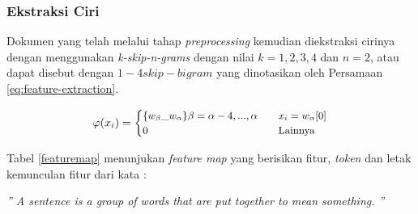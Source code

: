 \documentclass[../Proposal.tex]{subfiles}
\begin{document}
		\subsubsection{Ekstraksi Ciri }
		\noindent Dokumen yang telah melalui tahap \textit{preprocessing} kemudian diekstraksi cirinya dengan menggunakan \textit{k-skip-n-grams} dengan nilai $k= 1, 2, 3, 4$ dan $n=2$, atau dapat disebut dengan $1-4 skip-bigram$ yang dinotasikan oleh Persamaan \ref{eq:feature-extraction}.

		\begin{center}
			\begin{equation}
			\small
				\varphi(x_{i}) = 
					\begin{cases}
						\{w_{\beta}\_w_{\alpha}\} \beta = \alpha - 4 ,..., \alpha & \quad x_{i} = w_{\alpha}[0] \\
						0 & \quad \text{Lainnya} \\
					\end{cases}
					\label{eq:feature-extraction}
			\end{equation}
		\end{center}

		\noindent Tabel \ref{featuremap} menunjukan \textit{feature map} yang berisikan fitur, \textit{token} dan letak kemunculan fitur dari kata :

		\begin{center}
			\textit{” A sentence is a group of words that are put together to mean something. ”}
		\end{center}
\end{document}
